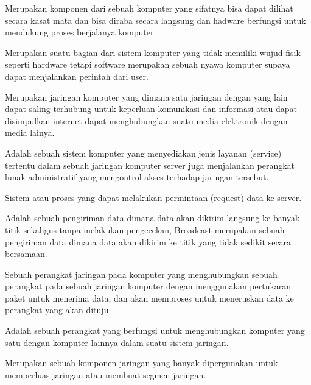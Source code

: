 Merupakan komponen dari sebuah komputer yang sifatnya bisa dapat dilihat secara kasat mata dan bisa diraba secara langsung dan hadware berfungsi untuk mendukung proses berjalanya komputer.

Merupakan suatu bagian dari sistem komputer yang tidak memiliki wujud fisik seperti hardware tetapi software merupakan sebuah nyawa komputer supaya dapat menjalankan perintah dari user.

Merupakan jaringan komputer yang dimana satu jaringan dengan yang lain dapat saling terhubung untuk keperluan komunikasi dan informasi atau dapat disimpulkan internet dapat menghubungkan suatu media elektronik dengan media lainya.

Adalah sebuah sistem komputer yang menyediakan jenis layanan (service) tertentu dalam sebuah jaringan komputer server juga menjalankan perangkat lunak administratif yang mengontrol akses terhadap jaringan tersebut.

Sistem atau proses yang dapat melakukan permintaan (request) data ke server.

Adalah sebuah pengiriman data dimana data akan dikirim langsung ke banyak titik sekaligus tanpa melakukan pengecekan,
Broadcast merupakan sebuah pengiriman data dimana data akan dikirim ke titik yang tidak sedikit secara bersamaan.

Sebuah perangkat jaringan pada komputer yang menghubungkan sebuah perangkat pada sebuah jaringan komputer dengan menggunakan pertukaran paket untuk menerima data, dan akan memproses untuk meneruskan data ke perangkat yang akan dituju.

Adalah sebuah perangkat yang berfungsi untuk menghubungkan komputer yang satu dengan komputer lainnya dalam suatu sistem jaringan. 

Merupakan sebuah komponen jaringan yang banyak dipergunakan untuk memperluas jaringan atau membuat segmen jaringan.
